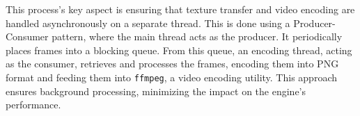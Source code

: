 This process's key aspect is ensuring that texture transfer and video encoding are handled asynchronously on a separate thread. This is done using a Producer-Consumer pattern, where the main thread acts as the producer. It periodically places frames into a blocking queue. From this queue, an encoding thread, acting as the consumer, retrieves and processes the frames, encoding them into PNG format and feeding them into \verb|ffmpeg|, a video encoding utility. This approach ensures background processing, minimizing the impact on the engine's performance.


